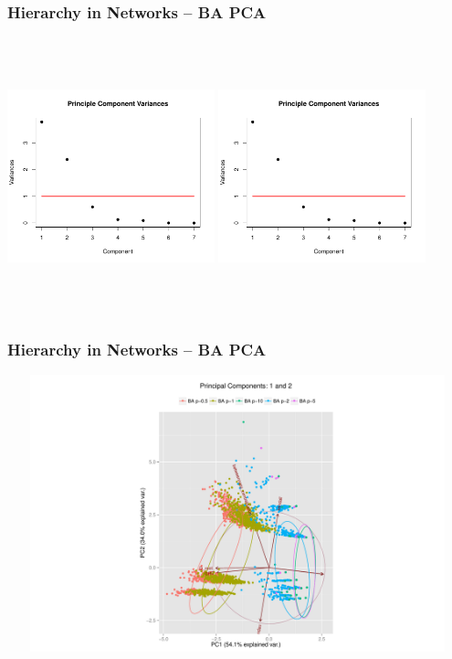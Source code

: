 \documentclass[xcolor={table}]{beamer}
\newenvironment{changemargin}[2]{%
  \begin{list}{}{%
    \setlength{\topsep}{0pt}%
    \setlength{\leftmargin}{#1}%
    \setlength{\rightmargin}{#2}%
    \setlength{\listparindent}{\parindent}%
    \setlength{\itemindent}{\parindent}%
    \setlength{\parsep}{\parskip}%
  }%
  \item[]}{\end{list}}
\begin{document}
\begin{frame}\frametitle{Hierarchy in Networks -- BA PCA}
	\begin{changemargin}{-2cm}{ -2cm}
		\centering
		\includegraphics[width=6cm, height=8cm]{images/BA_Param_PCA_Component_Varinces.pdf}
		\includegraphics[width=6cm, height=8cm]{images/BA_Size_PCA_Component_Varinces.pdf}
	\end{changemargin}
\end{frame}

\begin{frame}\frametitle{Hierarchy in Networks -- BA PCA}
	\begin{changemargin}{-2cm}{ -2cm}
		\centering
		\includegraphics[width=15cm, height=8cm]{images/BA_Param_PCA_Components1_2.pdf}
	\end{changemargin}
\end{frame}
\end{document}
